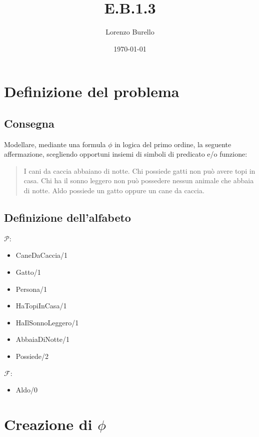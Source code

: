 \documentclass[a4paper, 12pt]{article}
\title{E.B.1.3}
\author{Lorenzo Burello}
\date{\today}
\begin{document}
\maketitle

\section{Definizione del problema}
\subsection{Consegna}
Modellare, mediante una formula $\phi$ in logica del primo ordine,
la seguente affermazione, scegliendo opportuni insiemi di simboli
di predicato e/o funzione: \newline
\begin{quote}
    I cani da caccia abbaiano di notte. Chi possiede gatti non può avere topi in casa.
    Chi ha il sonno leggero non può possedere nessun animale che abbaia di notte.
    Aldo possiede un gatto oppure un cane da caccia.
\end{quote}
\subsection{Definizione dell'alfabeto}
$\mathcal{P}$:
\begin{itemize}[label=-]
    \item CaneDaCaccia/1
    \item Gatto/1
    \item Persona/1
    \item HaTopiInCasa/1
    \item HaIlSonnoLeggero/1
    \item AbbaiaDiNotte/1
    \item Possiede/2
\end{itemize}

$\mathcal{F}$:
\begin{itemize}[label=-]
    \item Aldo/0
\end{itemize}

\section{Creazione di $\phi$}
\end{document}
